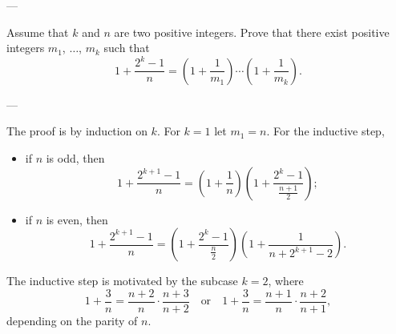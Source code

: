 
---

Assume that $k$ and $n$ are two positive integers. Prove that there exist positive integers $m_1$, $\ldots$, $m_k$ such that
\[1+\frac{2^k-1}n=\left(1+\frac1{m_1}\right)\cdots\left(1+\frac1{m_k}\right).\]


---

The proof is by induction on $k$. For $k=1$ let $m_1=n$. For the inductive step,
\begin{itemize}
    \item if $n$ is odd, then
        \[1+\frac{2^{k+1}-1}n=\left(1+\frac1n\right)\left(1+\frac{2^k-1}{\frac{n+1}2}\right);\]
    \item if $n$ is even, then
        \[1+\frac{2^{k+1}-1}n=\left(1+\frac{2^k-1}{\frac n2}\right)\left(1+\frac1{n+2^{k+1}-2}\right).\]
\end{itemize}
\begin{remark}
    The inductive step is motivated by the subcase $k=2$, where
    \[1+\frac3n=\frac{n+2}n\cdot\frac{n+3}{n+2}\quad\text{or}\quad1+\frac3n=\frac{n+1}n\cdot\frac{n+2}{n+1},\]
    depending on the parity of $n$.
\end{remark}


